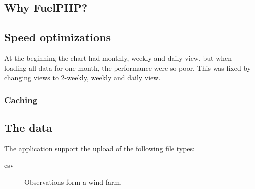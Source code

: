 \subsection{Why FuelPHP?}

\subsection{Speed optimizations}
At the beginning the chart had monthly, weekly and daily view, but when loading all data for one month, the performance were so poor. This was fixed by changing views to 2-weekly, weekly and daily view.
\subsubsection{Caching}

\subsection{The data}
The application support the upload of the following file types:
\begin{description}
\item[csv] Observations form a wind farm. 
\end{description}